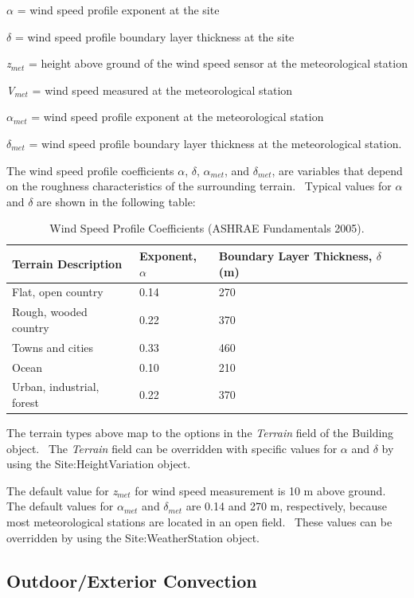 \emph{$\alpha$} = wind speed profile exponent at the site

\emph{$\delta$} = wind speed profile boundary layer thickness at the site

\emph{z\(_{met}\)} = height above ground of the wind speed sensor at the meteorological station

\emph{V\(_{met}\)} = wind speed measured at the meteorological station

\emph{$\alpha$\(_{met}\)} = wind speed profile exponent at the meteorological station

\emph{$\delta$\(_{met}\)} = wind speed profile boundary layer thickness at the meteorological station.

The wind speed profile coefficients \emph{$\alpha$}, \emph{$\delta$}, \emph{$\alpha$\(_{met}\)}, and \emph{$\delta$\(_{met}\)}, are variables that depend on the roughness characteristics of the surrounding terrain.~ Typical values for \emph{$\alpha$} and \emph{$\delta$} are shown in the following table:

\begin{longtable}[c]{p{3.0in}p{1.5in}p{1.5in}}

\caption{Wind Speed Profile Coefficients (ASHRAE Fundamentals 2005). \label{table:wind-speed-profile-coefficients-ashrae}} \tabularnewline
\toprule
Terrain Description       & Exponent, $\alpha$ & Boundary Layer Thickness, $\delta$ (m) \tabularnewline
\midrule
\endhead

Flat, open country        & 0.14 & 270 \tabularnewline
Rough, wooded country     & 0.22 & 370 \tabularnewline
Towns and cities          & 0.33 & 460 \tabularnewline
Ocean                     & 0.10 & 210 \tabularnewline
Urban, industrial, forest & 0.22 & 370 \tabularnewline
\bottomrule
\end{longtable}

The terrain types above map to the options in the \emph{Terrain} field of the Building object.~ The \emph{Terrain} field can be overridden with specific values for \emph{$\alpha$} and \emph{$\delta$} by using the Site:HeightVariation object.

The default value for \emph{z\(_{met}\)} for wind speed measurement is 10 m above ground.~ The default values for \emph{$\alpha$\(_{met}\)} and \emph{$\delta$\(_{met}\)} are 0.14 and 270 m, respectively, because most meteorological stations are located in an open field.~ These values can be overridden by using the Site:WeatherStation object.

\subsection{Outdoor/Exterior Convection}\label{outdoorexterior-convection}

